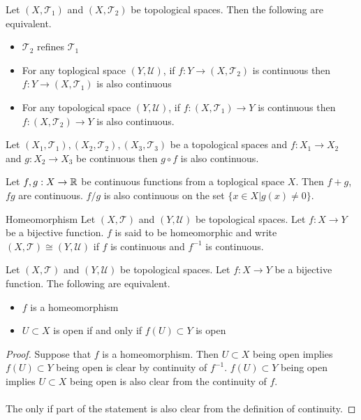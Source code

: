 \documentclass[a4paper]{article}
\begin{document}
\begin{prp}{}{} Let $(X,\mathcal{T}_1)$ and $(X,\mathcal{T}_2)$ be topological spaces. Then the following are equivalent. 
\begin{itemize}
\item $\mathcal{T}_2$ refines $\mathcal{T}_1$
\item For any toplogical space $(Y,\mathcal{U})$, if $f:Y\to (X,\mathcal{T}_2)$ is continuous then $f:Y\to (X,\mathcal{T}_1)$ is also continuous
\item For any topological space $(Y,\mathcal{U})$, if $f:(X,\mathcal{T}_1)\to Y$ is continuous then $f:(X,\mathcal{T}_2)\to Y$ is also continuous. 
\end{itemize}
\end{prp}

\begin{prp}{}{} Let $(X_1,\mathcal{T}_1),(X_2,\mathcal{T}_2),(X_3,\mathcal{T}_3)$ be a topological spaces and $f:X_1\to X_2$ and $g:X_2\to X_3$ be continuous then $g\circ f$ is also continuous. 
\end{prp}

\begin{prp}{}{} Let $f,g:X\to\mathbb{R}$ be continuous functions from a toplogical space $X$. Then $f+g$, $fg$ are continuous. $f/g$ is also continuous on the set $\{x\in X|g(x)\neq 0\}$. 
\end{prp}

\begin{defn}{Homeomorphism}{} Let $(X,\mathcal{T})$ and $(Y,\mathcal{U})$ be topological spaces. Let $f:X\to Y$ be a bijective function. $f$ is said to be homeomorphic and write $(X,\mathcal{T})\cong(Y,\mathcal{U})$ if $f$ is continuous and $f^{-1}$ is continuous. 
\end{defn}

\begin{prp}{}{} Let $(X,\mathcal{T})$ and $(Y,\mathcal{U})$ be topological spaces. Let $f:X\to Y$ be a bijective function. The following are equivalent. 
\begin{itemize}
\item $f$ is a homeomorphism
\item $U\subset X$ is open if and only if $f(U)\subset Y$ is open
\end{itemize} \tcbline
\begin{proof}
Suppose that $f$ is a homeomorphism. Then $U\subset X$ being open implies $f(U)\subset Y$ being open is clear by continuity of $f^{-1}$. $f(U)\subset Y$ being open implies $U\subset X$ being open is also clear from the continuity of $f$. \\~\\
The only if part of the statement is also clear from the definition of continuity. 
\end{proof}
\end{prp}
\end{document}
